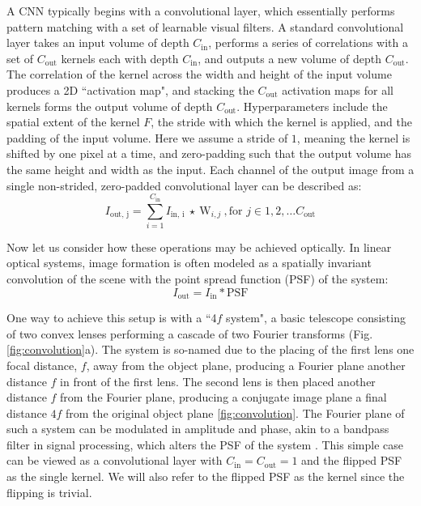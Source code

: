 \documentclass[fleqn,10pt]{wlscirep}
\begin{document}
A CNN typically begins with a convolutional layer, which essentially performs pattern matching with a set of learnable visual filters. A standard convolutional layer takes an input volume of depth $C_\text{in}$, performs a series of correlations with a set of $C_\text{out}$ kernels each with depth $C_\text{in}$, and outputs a new volume of depth $C_\text{out}$. The correlation of the kernel across the width and height of the input volume produces a 2D ``activation map", and stacking the $C_\text{out}$ activation maps for all kernels forms the output volume of depth $C_\text{out}$. Hyperparameters include the spatial extent of the kernel $F$, the stride with which the kernel is applied, and the padding of the input volume. Here we assume a stride of $1$, meaning the kernel is shifted by one pixel at a time, and zero-padding such that the output volume has the same height and width as the input. Each channel of the output image from a single non-strided, zero-padded convolutional layer can be described as:
\begin{equation}
I_\text{out, j}  = \sum_{i = 1}^{C_\text{in}} I_\text{in, i} \ \star \ \text{W}_{i,j}\ , \text{for } j \in 1, 2, \hdots C_\text{out} 
\end{equation}

Now let us consider how these operations may be achieved optically. In linear optical systems, image formation is often modeled as a spatially invariant convolution of the scene with the point spread function (PSF) of the system:
\begin{equation}
I_\text{out}  = I_\text{in} * \text{PSF}
\end{equation}

One way to achieve this setup is with a ``4$f$ system", a basic telescope consisting of two convex lenses performing a cascade of two Fourier transforms (Fig. \ref{fig:convolution}a). The system is so-named due to the placing of the first lens one focal distance, $f$, away from the object plane, producing a Fourier plane another distance $f$ in front of the first lens. The second lens is then placed another distance $f$ from the Fourier plane, producing a conjugate image plane a final distance $4f$ from the original object plane \ref{fig:convolution}. The Fourier plane of such a system can be modulated in amplitude and phase, akin to a bandpass filter in signal processing, which alters the PSF of the system \cite{goodman2008introduction}. This simple case can be viewed as a convolutional layer with $C_\text{in} = C_\text{out} = 1$ and the flipped PSF as the single kernel. We will also refer to the flipped PSF as the kernel since the flipping is trivial. 
\end{document}
